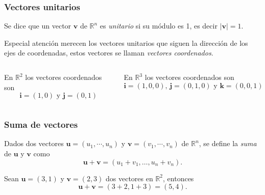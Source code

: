 \begin{frame}
\frametitle{Vectores unitarios}
\begin{definicion}
Se dice que un vector $\mathbf{v}$ de $\mathbb{R}^n$ es \emph{unitario} si su módulo es 1, es decir $|\mathbf{v}|=1$.
\end{definicion}
Especial atención merecen los vectores unitarios que siguen la dirección de los ejes de coordenadas, estos vectores se llaman \emph{vectores coordenados}.
\begin{columns}
\begin{column}{.48\textwidth}
En $\mathbb{R}^2$ los vectores coordenados son 
\[
\mathbf{i}=(1,0)\mbox{ y }\mathbf{j}=(0,1)
\]
\begin{center}
\scalebox{1}{}
\end{center}
\end{column}
\begin{column}{.48\textwidth}
En $\mathbb{R}^3$ los vectores coordenados son 
\[
\mathbf{i}=(1,0,0)\mbox{, }\mathbf{j}=(0,1,0) \mbox{ y } \mathbf{k}=(0,0,1)
\]
\begin{center}
\scalebox{1}{}
\end{center}
\end{column}   
\end{columns}
\end{frame} 


\begin{frame}
\frametitle{Suma de vectores}
\begin{definicion}
Dados dos vectores $\mathbf{u}=(u_1,\cdots,u_n)$ y $\mathbf{v}=(v_1,\cdots,v_n)$ de $\mathbb{R}^n$, se define la
\emph{suma} de $\mathbf{u}$ y $\mathbf{v}$ como
\[
\mathbf{u}+\mathbf{v} = (u_1+v_1,\ldots, u_n+v_n).
\]
\end{definicion}

Sean $\mathbf{u}=(3,1)$ y $\mathbf{v}=(2,3)$ dos vectores en $\mathbb{R}^2$, entonces
\[
\mathbf{u}+\mathbf{v} = (3+2,1+3) = (5,4).
\]

\begin{center}
\scalebox{0.8}{}
\end{center}
\end{frame} 


